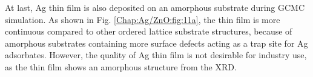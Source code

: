 At last, Ag thin film is also deposited on an amorphous substrate during \ac{GCMC} simulation. As shown in Fig. \ref{Chap:Ag/ZnO:fig:11a}, the thin film is more continuous compared to other ordered lattice substrate structures, because of amorphous substrates containing more surface defects acting as a trap site for Ag adsorbates. However, the quality of Ag thin film is not desirable for industry use, as the thin film shows an amorphous structure from the \ac{XRD}.